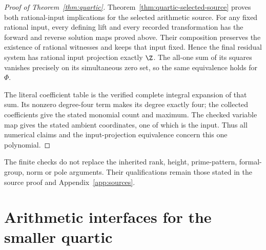 \begin{proof}[Proof of Theorem~\ref{thm:quartic}]
Theorem~\ref{thm:quartic-selected-source} proves both rational-input
implications for the selected arithmetic source. For any fixed rational
input, every defining lift and every recorded transformation has the
forward and reverse solution maps proved above. Their composition preserves
the existence of rational witnesses and keeps that input fixed. Hence the
final residual system has rational input projection exactly $\Z$.
The all-one sum of its squares vanishes precisely on its simultaneous
zero set, so the same equivalence holds for $\Phi$.

The literal coefficient table is the verified complete integral expansion
of that sum. Its nonzero degree-four term makes its degree exactly four;
the collected coefficients give the stated monomial count and maximum.
The checked variable map gives the stated ambient coordinates, one of
which is the input. Thus all numerical
claims and the input-projection equivalence concern this one polynomial.
\end{proof}

The finite checks do not replace the inherited rank, height, prime-pattern,
formal-group, norm or pole arguments. Their qualifications remain those
stated in the source proof and Appendix~\ref{app:sources}.

\section{Arithmetic interfaces for the smaller quartic}
\label{sec:v5-interfaces}

